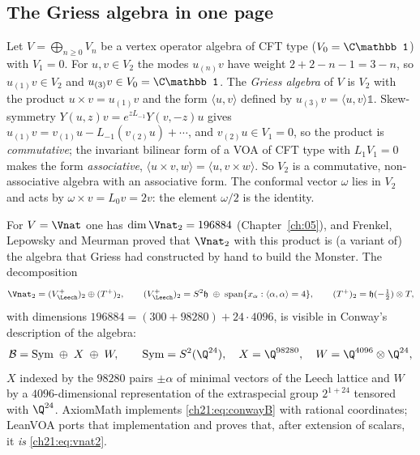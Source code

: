 \subsection{The Griess algebra in one page}

Let $V=\bigoplus_{n\ge0}V_n$ be a vertex operator algebra of CFT type ($V_0=\C\mathbb 1$) with
$V_1=0$.  For $u,v\in V_2$ the modes $u_{(n)}v$ have weight $2+2-n-1=3-n$, so $u_{(1)}v\in V_2$ and
$u_{(3)}v\in V_0=\C\mathbb1$.  The \emph{Griess algebra} of $V$ is $V_2$ with the product
$u\times v=u_{(1)}v$ and the form $\langle u,v\rangle$ defined by $u_{(3)}v=\langle u,v\rangle\mathbb1$.
Skew-symmetry $Y(u,z)v=e^{zL_{-1}}Y(v,-z)u$ gives
$u_{(1)}v=v_{(1)}u-L_{-1}(v_{(2)}u)+\cdots$, and $v_{(2)}u\in V_1=0$, so the product is
\emph{commutative}; the invariant bilinear form of a VOA of CFT type with $L_1V_1=0$ makes the form
\emph{associative}, $\langle u\times v,w\rangle=\langle u,v\times w\rangle$.  So $V_2$ is a
commutative, non-associative algebra with an associative form.  The conformal vector $\omega$ lies
in $V_2$ and acts by $\omega\times v=L_0v=2v$: the element $\omega/2$ is the identity.

For $V=\Vnat$ one has $\dim\Vnat_2=196884$ (Chapter~\ref{ch:05}), and Frenkel, Lepowsky and Meurman
proved that $\Vnat_2$ with this product is (a variant of) the algebra that Griess had constructed by
hand to build the Monster.  The decomposition
\begin{equation}\label{ch21:eq:vnat2}
  \Vnat_2=(V_\Leech^+)_2\oplus(T^+)_2,\qquad
  (V_\Leech^+)_2=S^2\mathfrak h\;\oplus\;\operatorname{span}\{x_\alpha:\langle\alpha,\alpha\rangle=4\},\qquad
  (T^+)_2=\mathfrak h(-\tfrac12)\otimes T,
\end{equation}
with dimensions $196884=(300+98280)+24\cdot4096$, is visible in Conway's description of the algebra:
\begin{equation}\label{ch21:eq:conwayB}
  \chXXIB=\chXXISym\;\oplus\;X\;\oplus\;W,\qquad
  \chXXISym=S^2(\Q^{24}),\quad X=\Q^{98280},\quad W=\Q^{4096}\otimes\Q^{24},
\end{equation}
$X$ indexed by the $98280$ pairs $\pm\alpha$ of minimal vectors of the Leech lattice and $W$ by a
$4096$-dimensional representation of the extraspecial group $2^{1+24}$ tensored with $\Q^{24}$.
AxiomMath implements \eqref{ch21:eq:conwayB} with rational coordinates; LeanVOA ports that
implementation and proves that, after extension of scalars, it \emph{is} \eqref{ch21:eq:vnat2}.

